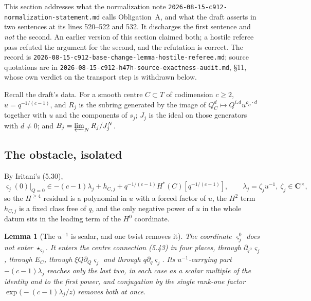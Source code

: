 \documentclass[11pt]{article}
\newtheorem{lemma}[theorem]{Lemma}
\theoremstyle{definition}
\theoremstyle{remark}
\newcommand{\C}{\mathbf C}
\begin{document}
This section addresses what the normalization note
\texttt{2026-08-15-c912-normalization-statement.md} calls Obligation~A, and what
the draft asserts in two sentences at its lines 520--522 and 532. It discharges
the first sentence and \emph{not} the second. An earlier version of this section
claimed both; a hostile referee pass refuted the argument for the second, and the
refutation is correct. The record is
\texttt{2026-08-15-c912-base-change-lemma-hostile-referee.md}; source quotations
are in \texttt{2026-08-15-c912-h47h-source-exactness-audit.md}, \S11, whose own
verdict on the transport step is withdrawn below.

Recall the draft's data. For a smooth centre $C\subset T$ of codimension $c\ge2$,
$u=q^{-1/(c-1)}$, and $R_j$ is the subring generated by the image of
$Q_C^d\mapsto Q^{i_*d}u^{\rho_C\cdot d}$ together with $u$ and the components of
$s_j$; $J_j$ is the ideal on those generators with $d\ne0$; and
$B_j=\varprojlim_NR_j/J_j^N$.

\subsection*{The obstacle, isolated}

By Iritani's (5.30),
\[
  \varsigma_j(0)|_{Q=0}\in-(c-1)\lambda_j+h_{C,j}
   +q^{-1/(c-1)}H^*(C)[q^{-1/(c-1)}],
  \qquad \lambda_j=\zeta_ju^{-1},\ \zeta_j\in\C^\times,
\]
so the $H^{\ge4}$ residual is a polynomial in $u$ with a forced factor of $u$, the
$H^2$ term $h_{C,j}$ is a fixed class free of $q$, and the only negative power of
$u$ in the whole datum sits in the leading term of the $H^0$ coordinate.

\begin{lemma}[The $u^{-1}$ is scalar, and one twist removes it]
\label{lem:h0-scalar}
The coordinate $\varsigma_j^0$ does not enter $\star_{\varsigma_j}$. It enters the
centre connection \textup{(5.43)} in four places, through
$\partial_{\widetilde\tau^\alpha}\varsigma_j$, through $E_C$, through
$\xi Q\partial_Q\varsigma_j$ and through $q\partial_q\varsigma_j$. Its
$u^{-1}$-carrying part $-(c-1)\lambda_j$ reaches only the last two, in each case
as a scalar multiple of the identity and to the first power, and conjugation by
the single rank-one factor $\exp\bigl(-(c-1)\lambda_j/z\bigr)$ removes both at
once.
\end{lemma}
\end{document}
